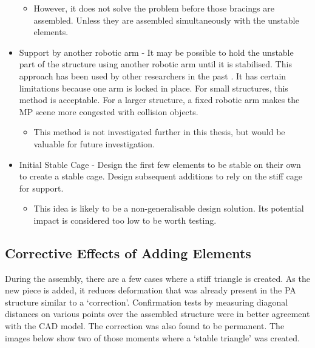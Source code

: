 \begin{itemize}
    \begin{itemize}
        \item However, it does not solve the problem before those bracings are assembled. Unless they are assembled simultaneously with the unstable elements.
    \end{itemize}
    \item Support by another robotic arm - It may be possible to hold the unstable part of the structure using another robotic arm until it is stabilised. This approach has been used by other researchers in the past \parencite{adelDesignRoboticallyFabricated2018,helmreichRoboticAssemblyModular2022,paraschoComputationalDesignRobotically2018}. It has certain limitations because one arm is locked in place. For small structures, this method is acceptable. For a larger structure, a fixed robotic arm makes the MP scene more congested with collision objects.
    \begin{itemize}
        \item This method is not investigated further in this thesis, but would be valuable for future investigation.
    \end{itemize}
    \item Initial Stable Cage - Design the first few elements to be stable on their own to create a stable cage. Design subsequent additions to rely on the stiff cage for support.
    \begin{itemize}
        \item This idea is likely to be a non-generalisable design solution. Its potential impact is considered too low to be worth testing.
    \end{itemize}
\end{itemize}

\subsection{Corrective Effects of Adding Elements}
\label{subsection:exploration-2-corrective-effects-of-adding-elements}

During the assembly, there are a few cases where a stiff triangle is created. As the new piece is added, it reduces deformation that was already present in the PA structure similar to a ‘correction’. Confirmation tests by measuring diagonal distances on various points over the assembled structure were in better agreement with the CAD model. The correction was also found to be permanent. The images below show two of those moments where a ‘stable triangle’ was created.

